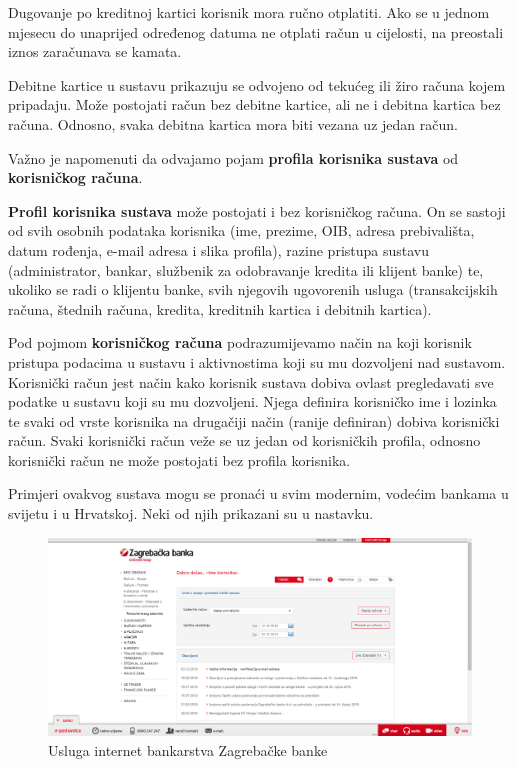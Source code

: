 		Dugovanje po kreditnoj kartici korisnik mora ručno otplatiti. Ako se u jednom mjesecu do unaprijed određenog datuma ne otplati račun u cijelosti, na preostali iznos zaračunava se kamata.
		
		Debitne kartice u sustavu prikazuju se odvojeno od tekućeg ili žiro računa kojem pripadaju. Može postojati račun bez debitne kartice, ali ne i debitna kartica bez računa. Odnosno, svaka debitna kartica mora biti vezana uz jedan račun.
		
		Važno je napomenuti da odvajamo pojam \textbf{profila korisnika sustava} od \textbf{korisničkog računa}.
		
		\textbf{Profil korisnika sustava} može postojati i bez korisničkog računa. On se sastoji od svih osobnih podataka korisnika (ime, prezime, OIB, adresa prebivališta, datum rođenja, e-mail adresa i slika profila), razine pristupa sustavu (administrator, bankar, službenik za odobravanje kredita ili klijent banke) te, ukoliko se radi o klijentu banke, svih njegovih ugovorenih usluga (transakcijskih računa, štednih računa, kredita, kreditnih kartica i debitnih kartica).
		
		Pod pojmom \textbf{korisničkog računa} podrazumijevamo način na koji korisnik pristupa podacima u sustavu i aktivnostima koji su mu dozvoljeni nad sustavom. Korisnički račun jest način kako korisnik sustava dobiva ovlast pregledavati sve podatke u sustavu koji su mu dozvoljeni. Njega definira korisničko ime i lozinka te svaki od vrste korisnika na drugačiji način (ranije definiran) dobiva korisnički račun. Svaki korisnički račun veže se uz jedan od korisničkih profila, odnosno korisnički račun ne može postojati bez profila korisnika.
		
		Primjeri ovakvog sustava mogu se pronaći u svim modernim, vodećim bankama u svijetu i u Hrvatskoj. Neki od njih prikazani su u nastavku.
		
		\begin{figure}[H]
			\includegraphics[scale=0.4]{slike/ezaba.PNG}
			\centering
			\caption{Usluga internet bankarstva Zagrebačke banke}
			\label{fig:ezaba}
		\end{figure}
	
